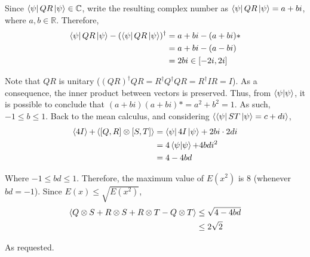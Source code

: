 Since $\bra{\psi} QR \ket{\psi} \in \mathbb{C}$,
write the resulting complex number as
$\bra{\psi} QR \ket{\psi} = a + bi$,
where $a, b \in \mathbb{R}$.
Therefore,
\begin{align}
    \bra{\psi}QR\ket{\psi} - (\bra{\psi} QR \ket{\psi})^\dagger
    &= a + bi - (a + bi)* \\
    &= a + bi - (a - bi) \\
    &= 2bi \in [-2i, 2i]
\end{align}

Note that $QR$ is unitary
($(QR)^\dagger QR = R^\dagger Q^\dagger Q R = R^\dagger I R = I$).
As a consequence, the inner product between vectors is preserved.
Thus, from $\mathop{\mathinner{ \langle{\psi}|{\psi}\rangle}}$,
it is possible to conclude that
$(a + bi)(a + bi)* = a^2 + b^2 = 1$.
As such, $-1 \leq b \leq 1$.
Back to the mean calculus,
and considering $\mathop{\mathinner{ \langle {\bra{\psi} ST \Ket{\psi} = c + di} \rangle}}$,
\begin{align}
    \mathop{\mathinner{ \langle {4I} \rangle}} + \mathop{\mathinner{ \langle {[Q, R] \otimes [S, T]} \rangle}} &=
        \bra{\psi} 4I \ket{\psi} + 2bi \cdot 2di \\
	&= 4 \mathop{\mathinner{ \langle{\psi}|{\psi}\rangle}} + 4 bd i^2 \\
	&= 4 - 4 bd
\end{align}

Where $-1 \leq bd \leq 1$.
Therefore, the maximum value of $E(x^2)$ is 8 (whenever $bd = -1$).
Since $E(x) \leq \sqrt{E(x^2)}$,
\begin{align}
	\mathop{\mathinner{ \langle {Q \otimes S + R \otimes S + R \otimes T - Q \otimes T} \rangle}} &\leq
		\sqrt{4 - 4bd} \\
	&\leq 2 \sqrt2
\end{align}

As requested.
